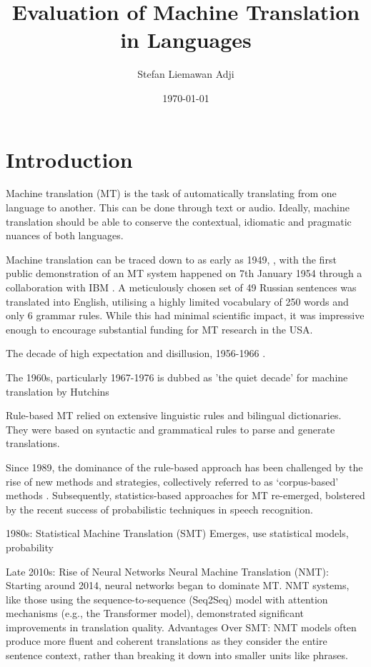 \documentclass[a4paper]{article}
\title{Evaluation of Machine Translation in Languages}
\author{Stefan Liemawan Adji}
\date{\today}
\begin{document}
\maketitle

\section{Introduction}

Machine translation (MT) is the task of automatically translating from one language to another. This can be done through text or audio. Ideally, machine translation should be able to conserve the contextual, idiomatic and pragmatic nuances of both languages.

Machine translation can be traced down to as early as 1949, \cite{weaver-1999}, with the first public demonstration of an MT system happened on 7th January 1954 through a collaboration with IBM \cite{hutchins-2006-first-mt}. A meticulously chosen set of 49 Russian sentences was translated into English, utilising a highly limited vocabulary of 250 words and only 6 grammar rules. While this had minimal scientific impact, it was impressive enough to encourage substantial funding for MT research in the USA.

The decade of high expectation and disillusion, 1956-1966 \cite{hutchins-2001-mt-50-years}.

The 1960s, particularly 1967-1976 is dubbed as 'the quiet decade' for machine translation by Hutchins \cite{hutchins-2001-mt-50-years}

Rule-based MT relied on extensive linguistic rules and bilingual dictionaries. They were based on syntactic and grammatical rules to parse and generate translations.

Since 1989, the dominance of the rule-based approach has been challenged by the rise of new methods and strategies, collectively referred to as ‘corpus-based’ methods \cite{hutchins-1994-research-methods-mt,hutchins-1998-development-mt}. Subsequently, statistics-based approaches for MT re-emerged, bolstered by the recent success of probabilistic techniques in
speech recognition.

1980s: Statistical Machine Translation (SMT) Emerges, use statistical models, probability

Late 2010s: Rise of Neural Networks
Neural Machine Translation (NMT): Starting around 2014, neural networks began to dominate MT. NMT systems, like those using the sequence-to-sequence (Seq2Seq) model with attention mechanisms (e.g., the Transformer model), demonstrated significant improvements in translation quality.
Advantages Over SMT: NMT models often produce more fluent and coherent translations as they consider the entire sentence context, rather than breaking it down into smaller units like phrases.
\end{document}
